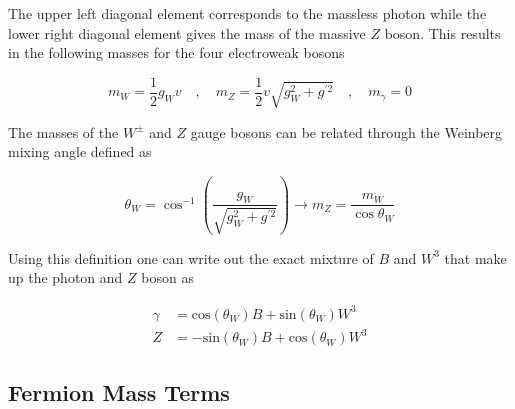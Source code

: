 The upper left diagonal element corresponds to the massless photon
while the lower right diagonal element gives the mass of the massive $Z$ boson.
This results in the following masses for the four electroweak bosons

\begin{equation}
m_{W} = \frac{1}{2}g_{W}v \quad , \quad m_Z = \frac{1}{2}v\sqrt{g_{W}^{2} + g^{'2}}
\quad , \quad m_\gamma = 0
\end{equation}

The masses of the $W^{\pm}$ and $Z$ gauge bosons can be related through the
Weinberg mixing angle defined as

\begin{equation}
\theta_W = \cos^{-1}\left( \frac{g_{W}}{\sqrt{g_{W}^{2}+g^{'2}}} \right) \rightarrow m_{Z} =
\frac{m_{W}}{\cos{\theta_{W}}}
\end{equation}

Using this definition one can write out the exact mixture of $B$ and $W^{3}$ that
make up the photon and $Z$ boson as

\begin{align}
\gamma &= \text{cos}(\theta_{W})B + \text{sin}(\theta_{W})W^{3} \\
Z &= -\text{sin}(\theta_{W})B + \text{cos}(\theta_{W})W^{3}
\end{align}

\subsection{Fermion Mass Terms} \label{sec:theory:fermion_mass}

